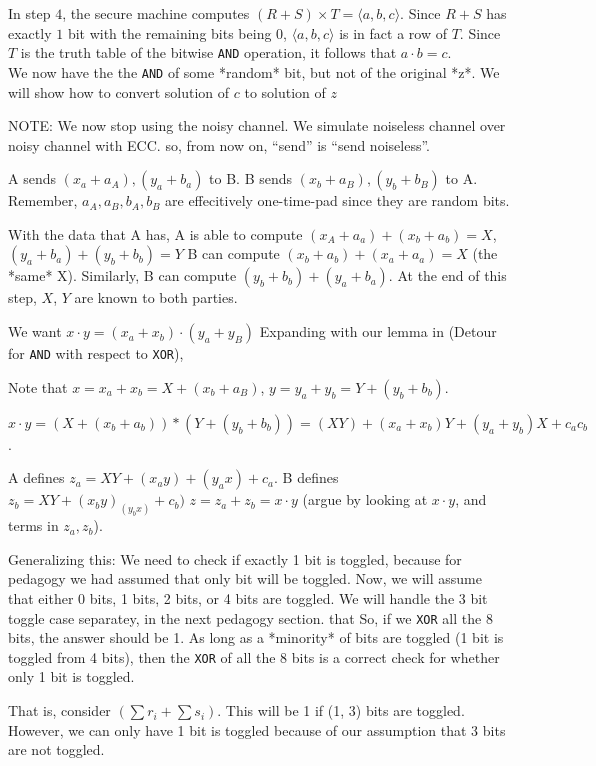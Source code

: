 \documentclass[11pt]{article}
\begin{document}
In step $4$, the secure machine computes $(R + S) \times T = \langle a, b, c \rangle $. Since $R + S$ has exactly $1$ bit with the remaining bits being $0$, $\langle a, b, c \rangle$ is in fact a row of $T$. Since $T$ is the truth table of the bitwise \texttt{AND} operation, it follows that $a \cdot b = c$. \\

  We now have the  the \texttt{AND} of some *random* bit, but not of the original *z*. We will show how to convert solution of $c$ to solution of $z$


NOTE: We now stop using the noisy channel. We simulate noiseless channel over noisy channel with ECC. so, from now on,
  ``send'' is ``send noiseless''.

 A sends $(x_a + a_A), (y_a + b_a)$ to B.
  B sends $(x_b + a_B), (y_b + b_B)$ to A. Remember, $a_A, a_B, b_A, b_B$ are effecitively one-time-pad since they
  are random bits.

 With the data that A has, A is able to compute $(x_A + a_a) + (x_b + a_b) = X$, $(y_a + b_a) + (y_b + b_b) = Y$
  B can compute $(x_b + a_b) + (x_a + a_a) = X$ (the *same* X). Similarly, B can compute
  $(y_b + b_b) + (y_a + b_a)$. At the end of this step, $X$, $Y$ are known to both parties.

  We want $x \cdot y = (x_a + x_b) \cdot (y_a + y_B)$ Expanding with our lemma in (Detour for \texttt{AND} with respect to \texttt{XOR}),

  Note that $x = x_a + x_b = X + (x_b + a_B)$, $y = y_a + y_b = Y + (y_b + b_b)$.
  
  $x \cdot y = (X + (x_b + a_b)) * (Y + (y_b + b_b)) = (XY) + (x_a + x_b)Y + (y_a + y_b)X + c_a c_b$.


 A defines $z_a = XY + (x_a y) + (y_a x) + c_a$. B defines $z_b = XY + (x_b y) _ (y_b x) + c_b)$
  $z = z_a + z_b = x \cdot y$ (argue by looking at $x \cdot y$, and terms in $z_a, z_b$).


 Generalizing this: We need to check if exactly 1 bit is toggled, because for pedagogy we had assumed that only
  bit will be toggled. Now, we will assume that either 0 bits, 1 bits, 2 bits, or 4 bits are toggled. We will
  handle the 3 bit toggle case separatey, in the next pedagogy section.
  that 
  So, if we \texttt{XOR} all the 8 bits, the answer should be 1. As long as a *minority* of bits are toggled (1 bit is toggled from 4 bits),
  then the \texttt{XOR} of all the 8 bits is a correct check for whether only 1 bit is toggled.

  That is, consider $(\sum r_i + \sum s_i)$. This will be 1 if (1, 3) bits are toggled. However, we can only have 1 bit is
  toggled because of our assumption that 3 bits are not toggled.
\end{document}
